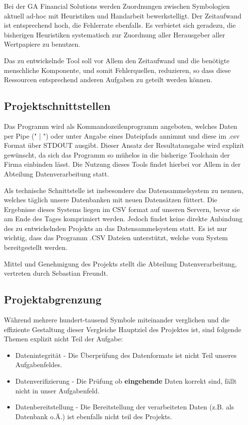 Bei der GA Financial Solutions werden Zuordnungen zwischen Symbologien
aktuell ad-hoc mit Heuristiken und Handarbeit bewerkstelligt.  Der
Zeitaufwand ist entsprechend hoch, die Fehlerrate ebenfalls.  Es
verbietet sich geradezu, die bisherigen Heuristiken systematisch zur
Zuordnung aller Herausgeber aller Wertpapiere zu benutzen.\par

Das zu entwickelnde Tool soll vor Allem den Zeitaufwand und die benötigte
menschliche Komponente, und somit Fehlerquellen, reduzieren, so dass diese Ressourcen entsprechend
anderen Aufgaben zu geteilt werden können.\par

\subsection{Projektschnittstellen}
Das Programm wird als Kommandozeilenprogramm angeboten, welches
Daten per Pipe (" | ")  oder unter Angabe eines Dateipfads annimmt und diese im .csv 
Format über STDOUT ausgibt. Dieser Ansatz der Resultatausgabe wird explizit gewünscht, 
da sich das Programm so mühelos in die bisherige Toolchain der Firma einbinden lässt.
Die Nutzung dieses Tools findet hierbei vor Allem in der Abteilung
Datenverarbeitung statt.\par

Als technische Schnittstelle ist insbesondere das Datensammelsystem zu nennen,
welches täglich unsere Datenbanken mit neuen Datensätzen füttert. Die Ergebnisse
dieses Systems liegen im CSV format auf unseren Servern, bevor sie am Ende des
Tages komprimiert werden. Jedoch findet keine direkte Anbindung des zu entwickelnden 
Projekts an das Datensammelsystem statt. Es ist nur wichtig, dass das Programm 
.CSV Dateien unterstützt, welche vom System bereitgestellt werden.\par

Mittel und Genehmigung des Projekts stellt die Abteilung Datenverarbeitung,
vertreten durch Sebastian Freundt.\par

\subsection{Projektabgrenzung}
Während mehrere hundert-tausend Symbole miteinander verglichen und die
effiziente Gestaltung dieser Vergleiche Hauptziel des Projektes ist, sind folgende
Themen explizit nicht Teil der Aufgabe:

\begin{itemize}
    \item Datenintegrität - Die Überprüfung des Datenformats ist nicht Teil unseres Aufgabenfeldes.
    \item Datenverifizierung - Die Prüfung ob \textbf{eingehende} Daten korrekt sind, fällt nicht in unser Aufgabenfeld.
    \item Datenbereitstellung - Die Bereitstellung der verarbeiteten Daten (z.B. als Datenbank o.Ä.) ist ebenfalls nicht teil des Projekts.
\end{itemize}
\clearpage

